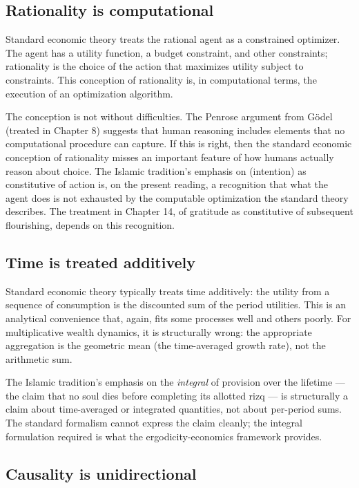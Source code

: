 \subsection{Rationality is computational}

Standard economic theory treats the rational agent as a constrained
optimizer. The agent has a utility function, a budget constraint,
and other constraints; rationality is the choice of the action that
maximizes utility subject to constraints. This conception of
rationality is, in computational terms, the execution of an
optimization algorithm.

The conception is not without difficulties. The Penrose argument
from G\"odel (treated in Chapter 8) suggests that human reasoning
includes elements that no computational procedure can capture. If
this is right, then the standard economic conception of rationality
misses an important feature of how humans actually reason about
choice. The Islamic tradition's emphasis on 
(intention) as constitutive of action is, on the present reading, a
recognition that what the agent does is not exhausted by the
computable optimization the standard theory describes. The treatment
in Chapter 14, of gratitude as constitutive of subsequent
flourishing, depends on this recognition.

\subsection{Time is treated additively}

Standard economic theory typically treats time additively: the
utility from a sequence of consumption is the discounted sum of the
period utilities. This is an analytical convenience that, again,
fits some processes well and others poorly. For multiplicative
wealth dynamics, it is structurally wrong: the appropriate
aggregation is the geometric mean (the time-averaged growth rate),
not the arithmetic sum.

The Islamic tradition's emphasis on the \emph{integral} of provision
over the lifetime --- the claim that no soul dies before completing
its allotted rizq --- is structurally a claim about time-averaged or
integrated quantities, not about per-period sums. The standard
formalism cannot express the claim cleanly; the integral formulation
required is what the ergodicity-economics framework provides.

\subsection{Causality is unidirectional}

